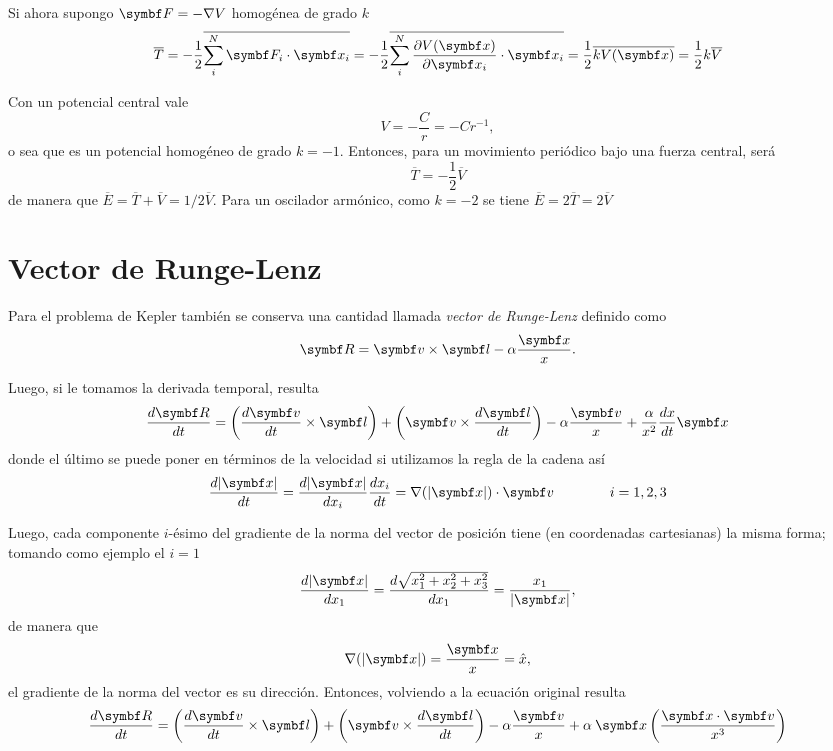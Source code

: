 \documentclass[10pt,oneside]{CBFT_book}
\begin{document}
Si ahora supongo $\vb{F} = -\nabla V$ homogénea de grado $k$
\[
	\overline{T} = -\frac{1}{2} \overline{ \sum_i^N \vb{F}_i \cdot \vb{x}_i } = 
	-\frac{1}{2} \overline{ \sum_i^N \dpar{V(\vb{x})}{\vb{x}_i} \cdot \vb{x}_i } = 
	\frac{1}{2} \overline{ k V(\vb{x} ) } = \frac{1}{2} k \overline{V}
\]

Con un potencial central vale 
\[
	V = -\frac{C}{r} = -Cr^{-1},
\]
o sea que es un potencial homogéneo de grado $k=-1$. Entonces, para un movimiento periódico bajo una fuerza central,
será 
\[
	\overline{T} = -\frac{1}{2}\overline{V}
\]
de manera que $\overline{E} = \overline{T} + \overline{V} = 1/2 \overline{V}$. Para un oscilador armónico, como $k=-2$
se tiene $\overline{E} = 2\overline{T} = 2\overline{V} $



\section{Vector de Runge-Lenz}

Para el problema de Kepler también se conserva una cantidad llamada {\it vector de Runge-Lenz} definido como
\[
	\vb{R} = \vb{v} \times \vb{l} - \alpha \frac{\vb{x}}{x}.
\]

Luego, si le tomamos la derivada temporal, resulta
\[
	\dtot{\vb{R}}{t} = \left( \dtot{\vb{v}}{t} \times \vb{l} \right) + \left( \vb{v} \times \dtot{\vb{l}}{t} \right)
	- \alpha\frac{ \vb{v} }{x} + \frac{ \alpha }{x^2} \dtot{x}{t} \vb{x}
\]
donde el último se puede poner en términos de la velocidad si utilizamos la regla de la cadena así
\[
	\dtot{|\vb{x}|}{t} = \dtot{|\vb{x}|}{x_i} \dtot{x_i}{t} = \nabla( |\vb{x}| )\cdot \vb{v} \qquad  \qquad i=1,2,3
\]

Luego, cada componente $i$-ésimo del gradiente de la norma del vector de posición tiene (en coordenadas cartesianas) la 
misma
forma; tomando como ejemplo el $i=1$
\[
	\dtot{|\vb{x}|}{x_1} = \dtot{\sqrt{x_1^2 + x_2^2 + x_3^2}}{x_1} = \frac{x_1}{|\vb{x}|},
\]
de manera que 
\[
	\nabla( |\vb{x}| ) = \frac{\vb{x}}{x} = \hat{x},
\]
el gradiente de la norma del vector es su dirección. Entonces, volviendo a la ecuación original resulta 
\[
	\dtot{\vb{R}}{t} = \left( \dtot{\vb{v}}{t} \times \vb{l} \right) + \left( \vb{v} \times \dtot{\vb{l}}{t} \right)
	- \alpha\frac{ \vb{v} }{x} + \alpha \:\vb{x} \left( \frac{ \pe{x}{v} }{x^3}\right) 
\]
\end{document}
